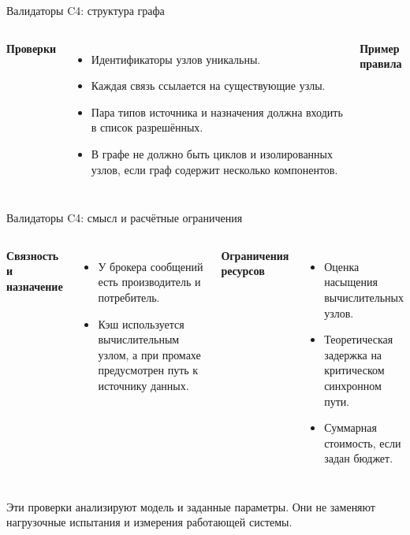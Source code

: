 \documentclass[aspectratio=169,10pt]{beamer}
\newcommand{\sectionlabel}[1]{{\color{Accent}\scriptsize\bfseries #1}\par\vspace{5pt}}
\newcommand{\softbox}[2]{\par\noindent{\color{Accent}\rule{2pt}{1.35em}}\hspace{0.45em}\begin{minipage}[t]{.91\linewidth}#2\end{minipage}\par}
\begin{document}
\begin{frame}{Валидаторы C4: структура графа}
\begin{columns}[T,onlytextwidth]
\sectionlabel{Проверки}
\begin{itemize}
\item Идентификаторы узлов уникальны.
\item Каждая связь ссылается на существующие узлы.
\item Пара типов источника и назначения должна входить в список разрешённых.
\item В графе не должно быть циклов и изолированных узлов, если граф содержит несколько компонентов.
\end{itemize}
\sectionlabel{Пример правила}
\end{columns}
\end{frame}

\begin{frame}{Валидаторы C4: смысл и расчётные ограничения}
\begin{columns}[T,onlytextwidth]
\sectionlabel{Связность и назначение}
\begin{itemize}
\item У брокера сообщений есть производитель и потребитель.
\item Кэш используется вычислительным узлом, а при промахе предусмотрен путь к источнику данных.
\end{itemize}
\sectionlabel{Ограничения ресурсов}
\begin{itemize}
\item Оценка насыщения вычислительных узлов.
\item Теоретическая задержка на критическом синхронном пути.
\item Суммарная стоимость, если задан бюджет.
\end{itemize}
\end{columns}
\vspace{0.35cm}
\softbox{Panel}{\small Эти проверки анализируют модель и заданные параметры. Они не заменяют нагрузочные испытания и измерения работающей системы.}
\end{frame}
\end{document}
